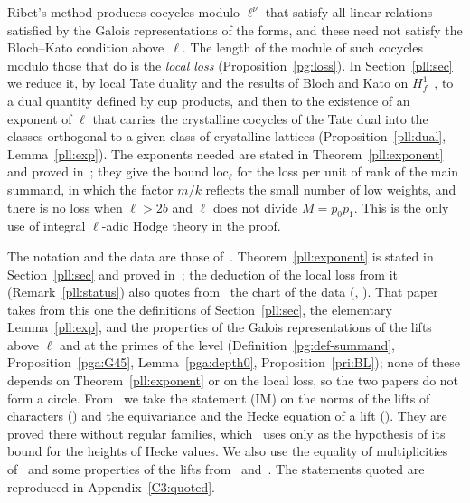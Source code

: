 \documentclass[10pt]{amsart}
\theoremstyle{definition}
\theoremstyle{remark}
\begin{document}
Ribet's method produces cocycles modulo $\ell^\nu$ that satisfy all linear relations satisfied by
the Galois representations of the forms, and these need not satisfy the Bloch--Kato condition
above~$\ell$. The length of the module of such cocycles modulo those that do is the
\emph{local loss} (Proposition~\ref{pg:loss}). In Section~\ref{pll:sec} we reduce it, by local
Tate duality and the results of Bloch and Kato on $H^1_f$~\cite{BlochKato,NSW}, to a dual
quantity defined by cup products, and then to the existence of an exponent of $\ell$ that
carries the crystalline cocycles of the Tate dual into the classes orthogonal to a given class
of crystalline lattices (Proposition~\ref{pll:dual}, Lemma~\ref{pll:exp}). The exponents needed
are stated in Theorem~\ref{pll:exponent} and proved in~\cite{P56}; they give the bound
$\mathrm{loc}_\ell$ for the loss per unit of rank of the main summand, in which the factor $m/k$
reflects the small number of low weights, and there is no loss when $\ell>2b$ and $\ell$ does
not divide $M=p_0p_1$. This is the only use of integral $\ell$-adic Hodge theory in the proof.

The notation and the data are those of~\cite{P46}. Theorem~\ref{pll:exponent} is stated in
Section~\ref{pll:sec} and proved in~\cite{P56}; the deduction of the local loss from it (Remark~\ref{pll:status}) also quotes from~\cite{P56} the chart of the data ({\cite[Theorem~7.9]{P56}}, {\cite[Definition~2.4]{P56}}). That paper takes from this one the definitions of
Section~\ref{pll:sec}, the elementary Lemma~\ref{pll:exp}, and the properties of the Galois
representations of the lifts above $\ell$ and at the primes of the level
(Definition~\ref{pg:def-summand}, Proposition~\ref{pga:G45}, Lemma~\ref{pga:depth0},
Proposition~\ref{pri:BL}); none of these depends on Theorem~\ref{pll:exponent} or on the local loss, so the two papers do not form
a circle. From~\cite{P54} we take the statement (IM) on the norms of the lifts of characters
({\cite[Propositions~3.8 and~3.12]{P54}}) and the equivariance and the Hecke equation of a
lift ({\cite[Lemma~2.2]{P54}}). They are proved there without regular families, which~\cite{P54}
uses only as the hypothesis of its bound for the heights of Hecke values. We also use the
equality of multiplicities of~\cite{P51} and some properties of the lifts from~\cite{P49}
and~\cite{P53}. The statements quoted are reproduced in Appendix~\ref{C3:quoted}.
\end{document}

